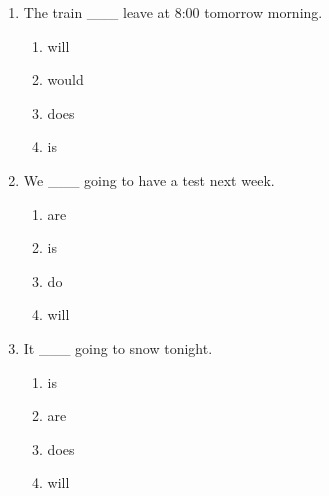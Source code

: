 \documentclass[11pt,a4paper]{ctexart}
\begin{document}
\begin{enumerate}[leftmargin=*,itemsep=4pt]
\begin{enumerate}[label=\Alph*.,leftmargin=2em,itemsep=1pt,topsep=2pt]
\end{enumerate}
\item The train \_\_\_ leave at 8:00 tomorrow morning.
\begin{enumerate}[label=\Alph*.,leftmargin=2em,itemsep=1pt,topsep=2pt]
\item will
\item would
\item does
\item is
\end{enumerate}
\item We \_\_\_ going to have a test next week.
\begin{enumerate}[label=\Alph*.,leftmargin=2em,itemsep=1pt,topsep=2pt]
\item are
\item is
\item do
\item will
\end{enumerate}
\item It \_\_\_ going to snow tonight.
\begin{enumerate}[label=\Alph*.,leftmargin=2em,itemsep=1pt,topsep=2pt]
\item is
\item are
\item does
\item will
\end{enumerate}
\end{enumerate}

\newpage
\end{document}

